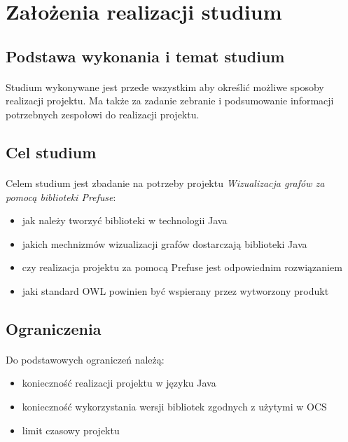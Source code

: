 \documentclass[a4paper,10pt]{article}
\begin{document}
\newpage
\tableofcontents
\newpage

\section{Założenia realizacji studium}

\subsection{Podstawa wykonania i temat studium}
\paragraph{} Studium wykonywane jest przede wszystkim aby określić możliwe sposoby realizacji projektu. Ma także za zadanie zebranie i podsumowanie informacji potrzebnych zespołowi do realizacji projektu.

\subsection{Cel studium}
\paragraph{} Celem studium jest zbadanie na potrzeby projektu \textit{Wizualizacja grafów za pomocą biblioteki Prefuse}:
\begin{itemize}
 	\item jak należy tworzyć biblioteki w technologii Java
 	\item jakich mechnizmów wizualizacji grafów dostarczają biblioteki Java
	\item czy realizacja projektu za pomocą Prefuse jest odpowiednim rozwiązaniem
	\item jaki standard OWL powinien być wspierany przez wytworzony produkt
\end{itemize}

\subsection{Ograniczenia}
\paragraph{} Do podstawowych ograniczeń należą:
\begin{itemize}
 	\item konieczność realizacji projektu w języku Java
	\item konieczność wykorzystania wersji bibliotek zgodnych z użytymi w OCS
	\item limit czasowy projektu
\end{itemize}
\end{document}
